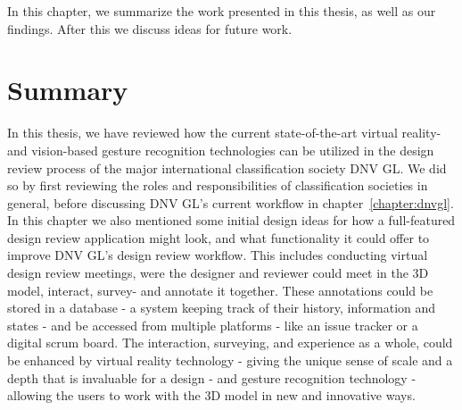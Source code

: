 
In this chapter, we summarize the work presented in this thesis, as well as our findings. After 
this we discuss ideas for future work.


\section{Summary}
In this thesis, we have reviewed how the current state-of-the-art virtual reality- and vision-based gesture recognition technologies can be utilized 
in the design review process of the major international classification society DNV GL. We did so by first reviewing the roles and responsibilities of classification societies 
in general, before discussing DNV GL's current workflow in chapter~\ref{chapter:dnvgl}. In this chapter we also mentioned some initial design ideas for how a full-featured 
design review application might look, and what functionality it could offer to improve DNV GL's design review workflow. This includes
conducting virtual design review meetings, were the designer and reviewer could meet in the 3D model, interact, survey- and annotate it together.
These annotations could be stored in a database - a system keeping track of their history, information and states - and be accessed from multiple platforms - like 
an issue tracker or a digital scrum board. The interaction, surveying, and experience as a whole, could be enhanced by virtual reality technology -
giving the unique sense of scale and a depth that is invaluable for a design - 
and gesture recognition technology - allowing the users to work with the 3D model in new and innovative ways. 

